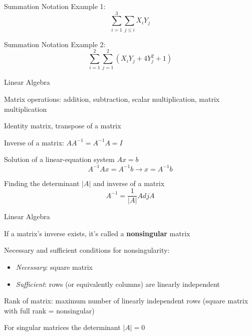 \documentclass{./../../Latex/teaching_slides}
\begin{document}
\begin{frame}{Summation Notation}
Example 1:
$$ \sum_{i=1}^3 \sum_{j\leq i} X_i Y_j $$
\end{frame}

\begin{frame}{Summation Notation}
Example 2:
$$ \sum_{i=1}^2 \sum_{j=1}^2 (X_i Y_j + 4Y_j^2 + 1)$$
\end{frame}

\begin{frame}{Linear Algebra}
\vspace{-.5em}
\begin{witemize}
  \item Matrix operations: addition, subtraction, scalar multiplication, matrix multiplication
  \item Identity matrix, transpose of a matrix
  \item Inverse of a matrix: $ A A^{-1} = A^{-1} A  = I $
  \item Solution of a linear-equation system $Ax = b$
  $$ A^{-1} A x  =  A^{-1}b \rightarrow x = A^{-1}b  $$
  \item Finding the determinant $|A|$ and inverse of a matrix $$A^{-1} = \frac{1}{|A|}Adj A$$
\end{witemize}
\end{frame}

\begin{frame}{Linear Algebra}
\begin{witemize}
  \item  If a matrix's inverse exists, it's called a \textbf{nonsingular} matrix
\item Necessary and sufficient conditions for nonsingularity: \vspace{0.25em}
\begin{itemize}
  \item \textit{Necessary}: square matrix
  \item \textit{Sufficient}: rows (or equivalently columns) are linearly independent
\end{itemize}
\item Rank of matrix: maximum number of linearly independent rows (square matrix with full rank = nonsingular)
\item For singular matrices the determinant $|A|=0$
\end{witemize}
\end{frame}
\end{document}

